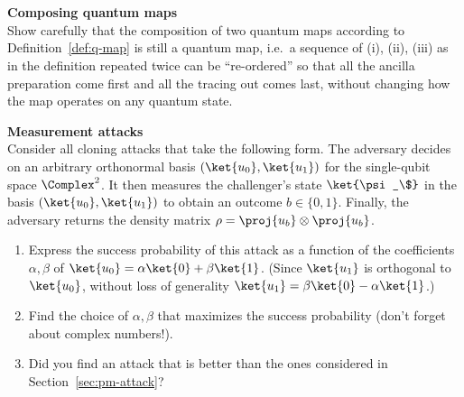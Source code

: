 \newcommand{\GC}{\ensuremath{\textsc{CLONE}}}


\chapter{}


\begin{exercises}

\item {\bf Composing quantum maps}\label{ex:map-composition}\\
 Show carefully that the composition of two quantum maps according to Definition~\ref{def:q-map} is still a quantum map, i.e.\ a sequence of (i), (ii), (iii) as in the definition repeated twice can be ``re-ordered'' so that all the ancilla preparation come first and all the tracing out comes last, without changing how the map operates on any quantum state. 

\item {\bf Measurement attacks}\\
Consider all cloning attacks that take the following form. The adversary decides on an arbitrary orthonormal basis $(\ket{u_0},\ket{u_1})$ for the single-qubit space $\Complex^2$. It then measures the challenger's state $\ket{\psi_\$}$ in the basis $(\ket{u_0},\ket{u_1})$ to obtain an outcome $b\in\{0,1\}$. Finally, the adversary returns the density matrix $\rho = \proj{u_b}\otimes \proj{u_b}$. 
\begin{enumerate}
\item Express the success probability of this attack as a function of the coefficients $\alpha,\beta$ of $\ket{u_0} = \alpha \ket{0} + \beta\ket{1}$. (Since $\ket{u_1}$ is orthogonal to $\ket{u_0}$, without loss of generality $\ket{u_1} = \beta\ket{0} - \alpha \ket{1}$.) 
\item Find the choice of $\alpha,\beta$ that maximizes the success probability (don't forget about complex numbers!). 
\item Did you find an attack that is better than the ones considered in Section~\ref{sec:pm-attack}? 
\end{enumerate}


\end{exercises}
